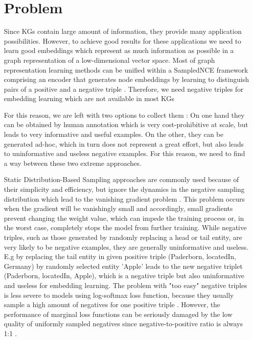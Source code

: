 \chapter{Problem}
\label{ch:problem}

Since \acp{KG} contain large amount of information, they provide many application possibilities.
However, to achieve good results for these applications we need to learn good embeddings which represent as much information as possible in a graph representation of a low-dimensional vector space.
Most of graph representation learning methods can be unified within a \ac{SampledNCE} framework comprising an encoder that generates node embeddings by learning to distinguish pairs of a positive and a negative triple \cite{MCNS}.
Therefore, we need negative triples for embedding learning which are not available in most \acp{KG} 

For this reason, we are left with two options to collect them \cite{safavi2021negater}: 
On one hand they can be obtained by human annotation which is very cost-prohibitive at scale, but leads to very informative and useful examples. 
On the other, they can be generated ad-hoc, which in turn does not represent a great effort, but also leads to uninformative and useless negative examples.
For this reason, we need to find a way between these two extreme approaches.

Static Distribution-Based Sampling approaches are commonly used because of their simplicity and efficiency, but ignore the dynamics in the negative sampling distribution which lead to 
the vanishing gradient problem \cite{qianunderstanding}.
This problem occurs when the gradient will be vanishingly small and accordingly, small gradients prevent changing the weight value, which can impede the training process or, in the worst case, completely stops the model from further training.
While negative triples, such as those generated by randomly replacing a head or tail entity, are very likely to be negative examples, they are generally uninformative and useless.
E.g by replacing the tail entity in given positive triple (Paderborn, locatedIn, Germany) by randomly selected entity 'Apple' leads to the new negative triplet (Paderborn, locatedIn, Apple), which is a negative triple but also uninformative and useless for embedding learning.
The problem with "too easy" negative triples is less severe to models using log-softmax loss function, because they usually sample a high amount of negatives for one positive triple \cite{cai2017kbgan}.
However, the performance of marginal loss functions can be seriously damaged by the low quality of uniformly sampled negatives since negative-to-positive ratio is always 1:1 \cite{cai2017kbgan}.

